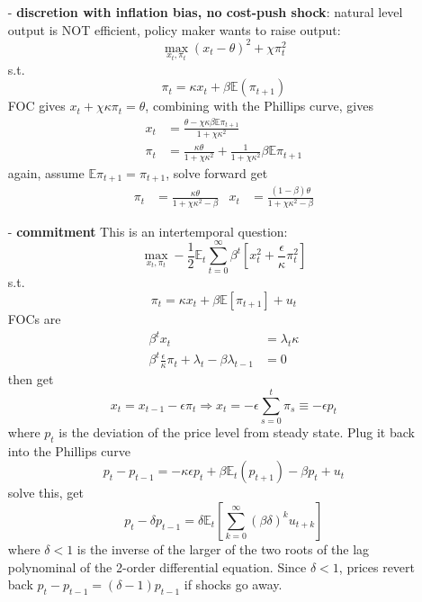 \documentclass[10pt,landscape,a4paper]{article}
\begin{document}
\begin{multicols*}{3}
\begin{itemize}
    \item[-] \textbf{\color{myred}discretion with inflation bias, no cost-push shock}: natural level output is NOT efficient, policy maker wants to raise output:
    $$
    \max_{x_t,\pi_t}(x_t-\theta)^2+\chi \pi_t^2
    $$
    s.t. 
    $$
    \pi_t = \kappa x_t + \beta \mathbb{E}(\pi_{t+1})
    $$
    FOC gives $x_t +\chi \kappa \pi_t =\theta$, combining with the Phillips curve, gives
    \begin{align*}
        x_t &= \frac{\theta-\chi\kappa \beta\mathbb{E}\pi_{t+1}}{1+\chi\kappa^2} \\
        \pi_t &= \frac{\kappa\theta}{1+\chi\kappa^2}+\frac{1}{1+\chi\kappa^2}\beta\mathbb{E}\pi_{t+1}
    \end{align*}
    again, assume $\mathbb{E}\pi_{t+1}=\pi_{t+1}$, solve forward get
    \begin{align*}
        \pi_t &= \frac{\kappa\theta}{1+\chi\kappa^2-\beta} & x_t &= \frac{(1-\beta)\theta}{1+\chi\kappa^2-\beta}
    \end{align*}

\item[-] \textbf{\color{myred}commitment}
This is an intertemporal question:
$$
\max_{x_t,\pi_t}-\frac{1}{2}\mathbb{E}_t\sum^{\infty}_{t=0}\beta^t\left[x_t^2 + \frac{\epsilon}{\kappa}\pi^2_t\right]
$$
s.t.
$$
\pi_t= \kappa x_t +\beta\mathbb{E}[\pi_{t+1}]+u_t
$$
FOCs are 
\begin{align*}
    \beta^t x_t &=\lambda_t \kappa\\
    \beta^t\frac{\epsilon}{\kappa}\pi_t +\lambda_t -\beta\lambda_{t-1} &=0
\end{align*}
then get
$$
 x_t =x_{t-1} - \epsilon \pi_t \Rightarrow x_t = -\epsilon\sum^t_{s=0}\pi_s \equiv -\epsilon p_t
$$
where $p_t$ is the deviation of the price level from steady state. Plug it back into the Phillips curve
$$
p_t - p_{t-1} = -\kappa \epsilon p_t +\beta\mathbb{E}_t(p_{t+1})-\beta p_t+u_t
$$
solve this, get
$$
p_t-\delta p_{t-1} =\delta \mathbb{E}_t\left[\sum^{\infty}_{k=0}(\beta\delta)^ku_{t+k}\right]
$$
where $\delta<1$ is the inverse of the larger of the two roots of the lag polynominal of the 2-order differential equation. Since $\delta<1$, prices revert back $p_t-p_{t-1}= (\delta-1)p_{t-1}$ if shocks go away.


\end{itemize}
\end{multicols*}
\end{document}
